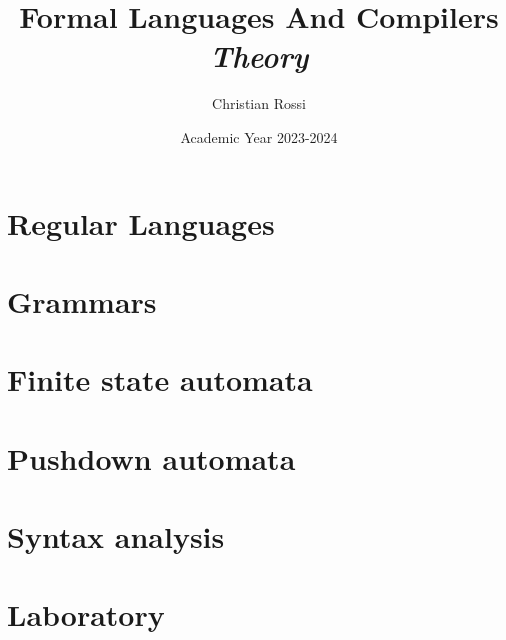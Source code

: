 \documentclass[12pt, a4paper]{report}
\title{Formal Languages And Compilers \\ \textit{Theory}}
\author{Christian Rossi}
\date{Academic Year 2023-2024}
\begin{document}
    \maketitle

    

    \cleardoublepage

    \tableofcontents

    \cleardoublepage

    \chapter{Regular Languages}
    
    
    
    

    \chapter{Grammars}
    
    
    
    
    
    
    
    
    
    
    
    

    \chapter{Finite state automata}
    
    
    
    
    
    
    
    

    \chapter{Pushdown automata}
    
    


    \chapter{Syntax analysis}
    
    
    
    
    

    \chapter{Laboratory}
    
    
    
    
\end{document}
